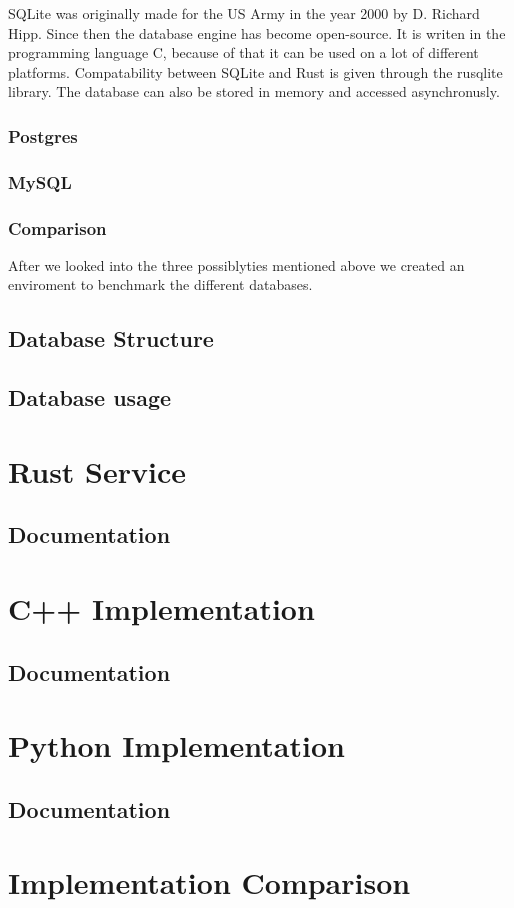 SQLite was originally made for the US Army in the year 2000 by D. Richard Hipp. Since then the database engine has become open-source. It is writen in the programming language
C, because of that it can be used on a lot of different platforms. Compatability between SQLite and Rust is given through the rusqlite library. The database can also be stored
in memory and accessed asynchronusly. 

\subsubsection{Postgres}


\subsubsection{MySQL}


\subsubsection{Comparison}
After we looked into the three possiblyties mentioned above we created an enviroment to benchmark the different databases.

\subsection{Database Structure}


\subsection{Database usage}


\section{Rust Service}
\subsection{Documentation}

\section{C++ Implementation}
\subsection{Documentation}

\section{Python Implementation}
\subsection{Documentation}

\section{Implementation Comparison}

\filbreak
